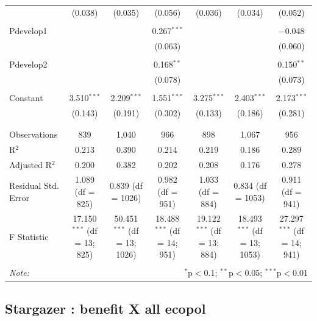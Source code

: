 \documentclass[
]{article}
\begin{document}
\begin{landscape}
\begin{table}[!htbp]
\begin{tabular}{@{\extracolsep{5pt}}lcccccc}
  & (0.038) & (0.035) & (0.056) & (0.036) & (0.034) & (0.052) \\ 
  & & & & & & \\ 
 Pdevelop1 &  &  & 0.267$^{***}$ &  &  & $-$0.048 \\ 
  &  &  & (0.063) &  &  & (0.060) \\ 
  & & & & & & \\ 
 Pdevelop2 &  &  & 0.168$^{**}$ &  &  & 0.150$^{**}$ \\ 
  &  &  & (0.078) &  &  & (0.073) \\ 
  & & & & & & \\ 
 Constant & 3.510$^{***}$ & 2.209$^{***}$ & 1.551$^{***}$ & 3.275$^{***}$ & 2.403$^{***}$ & 2.173$^{***}$ \\ 
  & (0.143) & (0.191) & (0.302) & (0.133) & (0.186) & (0.281) \\ 
  & & & & & & \\ 
\hline \\[-1.8ex] 
Observations & 839 & 1,040 & 966 & 898 & 1,067 & 956 \\ 
R$^{2}$ & 0.213 & 0.390 & 0.214 & 0.219 & 0.186 & 0.289 \\ 
Adjusted R$^{2}$ & 0.200 & 0.382 & 0.202 & 0.208 & 0.176 & 0.278 \\ 
Residual Std. Error & 1.089 (df = 825) & 0.839 (df = 1026) & 0.982 (df = 951) & 1.033 (df = 884) & 0.834 (df = 1053) & 0.911 (df = 941) \\ 
F Statistic & 17.150$^{***}$ (df = 13; 825) & 50.451$^{***}$ (df = 13; 1026) & 18.488$^{***}$ (df = 14; 951) & 19.122$^{***}$ (df = 13; 884) & 18.493$^{***}$ (df = 13; 1053) & 27.297$^{***}$ (df = 14; 941) \\ 
\hline 
\hline \\[-1.8ex] 
\textit{Note:}  & \multicolumn{6}{r}{$^{*}$p$<$0.1; $^{**}$p$<$0.05; $^{***}$p$<$0.01} \\ 
\end{tabular} 
\end{table} 
\endgroup
\end{landscape}

\newpage

\hypertarget{stargazer-benefit-x-all-ecopol}{%
\subsection{Stargazer : benefit X all
ecopol}\label{stargazer-benefit-x-all-ecopol}}

\begingroup\setlength{\tabcolsep}{1pt}
\end{document}
